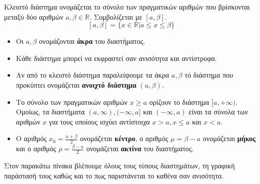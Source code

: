 Κλειστό διάστημα ονομάζεται το σύνολο των πραγματικών αριθμών που βρίσκονται μεταξύ δύο αριθμών $ a,\beta\in\mathbb{R} $. Συμβολίζεται με $ [a,\beta] $.
\[ [a,\beta]=\{x\in\mathbb{R}|a\leq x\leq \beta\} \]
\begin{itemize}[itemsep=0mm]
\item Οι $ a,\beta $ ονομάζονται \textbf{άκρα} του διαστήματος.
\item Κάθε διάστημα μπορεί να εκφραστεί σαν ανισότητα και αντίστροφα.
\item Αν από το κλειστό διάστημα παραλείψουμε τα άκρα $ a,\beta $ τό διάστημα που προκύπτει ονομάζεται \textbf{ανοιχτό διάστημα} $ (a,\beta) $.
\item Το σύνολο των πραγματικών αριθμών $ x\geq a $ ορίζουν το διάστημα $ [a,+\infty) $. Ομοίως, τα διαστήματα $ (a,\infty), (-\infty,a] $ και $ (-\infty,a) $ είναι τα σύνολα των αριθμών $ x $ για τους οποίους ισχύει αντίστοιχα $ x>a,x\leq a $ και $ x<a $.
\item Ο αριθμός $ x_0=\frac{a+\beta}{2} $ ονομάζεται \textbf{κέντρο}, ο αριθμός $ \mu=\beta-a $ ονομάζεται \textbf{μήκος} και ο αριθμός $ \rho=\frac{\beta-a}{2} $ ονομάζεται \textbf{ακτίνα} του διαστήματος.
\end{itemize}
Στον παρακάτω πίνακα βλέπουμε όλους τους τύπους διαστημάτων, τη γραφική παράστασή τους καθώς και το πως παριστάνεται το καθένα σαν ανισότητα.
